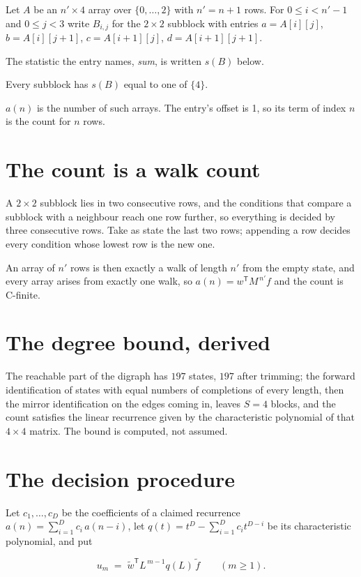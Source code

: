 \documentclass[11pt]{article}
\theoremstyle{definition}
\begin{document}
Let $A$ be an $n' \times 4$ array over $\{0,\dots,2\}$ with $n' = n + 1$ rows. For $0 \le i < n'-1$ and $0 \le j < 3$ write $B_{i,j}$ for the $2\times2$ subblock with entries $a = A[i][j]$, $b = A[i][j{+}1]$, $c = A[i{+}1][j]$, $d = A[i{+}1][j{+}1]$.

The statistic the entry names, {\itshape sum}, is written $s(B)$ below.

Every subblock has $s(B)$ equal to one of $\{4\}$.

$a(n)$ is the number of such arrays. The entry's offset is 1, so its term of index $n$ is the count for $n$ rows.

\section{The count is a walk count}

A $2\times2$ subblock lies in two consecutive rows, and the conditions that compare a subblock with a neighbour reach one row further, so everything is decided by three consecutive rows. Take as state the last two rows; appending a row decides every condition whose lowest row is the new one.

An array of $n'$ rows is then exactly a walk of length $n'$ from the empty state, and every array arises from exactly one walk, so $a(n) = w^{\mathsf T}M^{\,n'}f$ and the count is C-finite.

\section{The degree bound, derived}

The reachable part of the digraph has $197$ states, $197$ after trimming; the forward identification of states with equal numbers of completions of every length, then the mirror identification on the edges coming in, leaves $S = 4$ blocks, and the count satisfies the linear recurrence given by the characteristic polynomial of that $4\times4$ matrix. The bound is computed, not assumed.

\section{The decision procedure}

Let $c_1,\dots,c_D$ be the coefficients of a claimed recurrence $a(n) = \sum_{i=1}^{D} c_i\,a(n-i)$, let $q(t) = t^{D} - \sum_{i=1}^{D} c_i t^{D-i}$ be its characteristic polynomial, and put

\[u_m \;=\; \tilde w^{\mathsf T} L^{\,m-1} q(L)\,\tilde f \qquad (m \ge 1).\]
\end{document}
